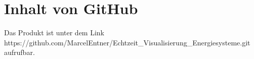 \section{Inhalt von GitHub}
Das Produkt ist unter dem Link https://github.com/MarcelEntner/Echtzeit\_Visualisierung\_Energiesysteme.git  aufrufbar.






